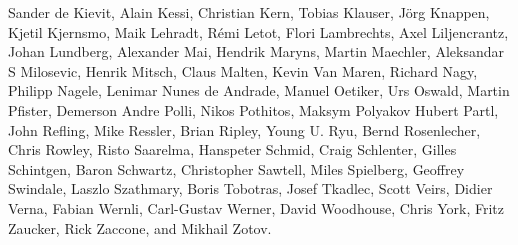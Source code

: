 {Sander de Kievit,       %
Alain Kessi,            %
Christian Kern,         %
Tobias Klauser,     %
J\"org Knappen,         %
Kjetil Kjernsmo,        %
Maik Lehradt,           %
R\'emi Letot,           %
Flori Lambrechts,       %
Axel Liljencrantz,  %
Johan Lundberg,         %
Alexander Mai,          %
Hendrik Maryns,         %
Martin Maechler,        %
Aleksandar S Milosevic, %
Henrik Mitsch,          %
Claus Malten,           %
Kevin Van Maren,        %
Richard Nagy,           %
Philipp Nagele,         %
Lenimar Nunes de Andrade, %
Manuel Oetiker,         %
Urs Oswald,             %
Martin Pfister,     %
Demerson Andre Polli,   %
Nikos Pothitos,     %
Maksym Polyakov         %
Hubert Partl,           %
John Refling,           %
Mike Ressler,           %
Brian Ripley,           %
Young U. Ryu,           %
Bernd Rosenlecher,      %
Chris Rowley,           %
Risto Saarelma,         %
Hanspeter Schmid,       %
Craig Schlenter,        %
Gilles Schintgen,       %
Baron Schwartz,         %
Christopher Sawtell,    %
Miles Spielberg,        %
Geoffrey Swindale,      %
Laszlo Szathmary,       %
Boris Tobotras,         %
Josef Tkadlec,          %
Scott Veirs,            %
Didier Verna,           %
Fabian Wernli,          %
Carl-Gustav Werner,     %
David Woodhouse,        %
Chris York,             %
Fritz Zaucker,          %
Rick Zaccone,           %
and Mikhail Zotov.      %

}

